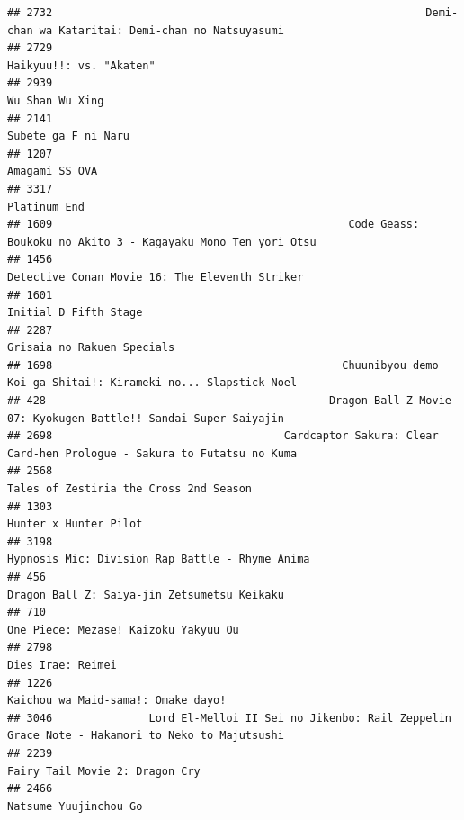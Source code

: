 \documentclass[
]{article}
\begin{document}
\begin{verbatim}
## 2732                                                          Demi-chan wa Kataritai: Demi-chan no Natsuyasumi
## 2729                                                                                   Haikyuu!!: vs. "Akaten"
## 2939                                                                                           Wu Shan Wu Xing
## 2141                                                                                       Subete ga F ni Naru
## 1207                                                                                            Amagami SS OVA
## 3317                                                                                              Platinum End
## 1609                                              Code Geass: Boukoku no Akito 3 - Kagayaku Mono Ten yori Otsu
## 1456                                                            Detective Conan Movie 16: The Eleventh Striker
## 1601                                                                                     Initial D Fifth Stage
## 2287                                                                                Grisaia no Rakuen Specials
## 1698                                             Chuunibyou demo Koi ga Shitai!: Kirameki no... Slapstick Noel
## 428                                            Dragon Ball Z Movie 07: Kyokugen Battle!! Sandai Super Saiyajin
## 2698                                    Cardcaptor Sakura: Clear Card-hen Prologue - Sakura to Futatsu no Kuma
## 2568                                                                    Tales of Zestiria the Cross 2nd Season
## 1303                                                                                     Hunter x Hunter Pilot
## 3198                                                           Hypnosis Mic: Division Rap Battle - Rhyme Anima
## 456                                                                Dragon Ball Z: Saiya-jin Zetsumetsu Keikaku
## 710                                                                       One Piece: Mezase! Kaizoku Yakyuu Ou
## 2798                                                                                         Dies Irae: Reimei
## 1226                                                                        Kaichou wa Maid-sama!: Omake dayo!
## 3046               Lord El-Melloi II Sei no Jikenbo: Rail Zeppelin Grace Note - Hakamori to Neko to Majutsushi
## 2239                                                                            Fairy Tail Movie 2: Dragon Cry
## 2466                                                                                     Natsume Yuujinchou Go

\end{verbatim}
\end{document}
